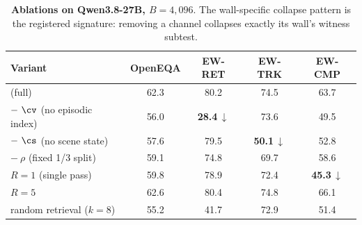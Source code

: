 \begin{table}[t]
\centering\small
\caption{\textbf{Ablations on Qwen3.8-27B, $B{=}4{,}096$}\pred{}. The wall-specific collapse pattern is the registered signature: removing a channel collapses exactly its wall's witness subtest.}
\label{tab:ablation}
\begin{tabular}{lcccc}
\toprule
Variant & OpenEQA & EW-RET & EW-TRK & EW-CMP \\
\midrule
\ASP{} (full)               & 62.3\pred{} & 80.2\pred{} & 74.5\pred{} & 63.7\pred{} \\
$-\ \cv$ (no episodic index)  & 56.0\pred{} & \textbf{28.4}\pred{}\,$\downarrow$ & 73.6\pred{} & 49.5\pred{} \\
$-\ \cs$ (no scene state)     & 57.6\pred{} & 79.5\pred{} & \textbf{50.1}\pred{}\,$\downarrow$ & 52.8\pred{} \\
$-\ \rho$ (fixed 1/3 split)   & 59.1\pred{} & 74.8\pred{} & 69.7\pred{} & 58.6\pred{} \\
$R{=}1$ (single pass)         & 59.8\pred{} & 78.9\pred{} & 72.4\pred{} & \textbf{45.3}\pred{}\,$\downarrow$ \\
$R{=}5$                       & 62.6\pred{} & 80.4\pred{} & 74.8\pred{} & 66.1\pred{} \\
random retrieval ($k{=}8$)    & 55.2\pred{} & 41.7\pred{} & 72.9\pred{} & 51.4\pred{} \\
\bottomrule
\end{tabular}
\end{table}
